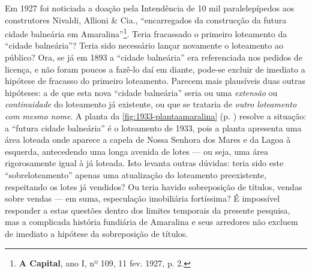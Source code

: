 Em 1927 foi noticiada a doação pela Intendência de 10 mil paralelepípedos aos construtores Nivaldi, Allioni \& Cia., ``encarregados da construcção da futura cidade balneária em Amaralina''\footnote{\textbf{A Capital}, ano I, nº 109, 11 fev. 1927, p. 2.}. Teria fracassado o primeiro loteamento da ``cidade balneária''? Teria sido necessário lançar novamente o loteamento ao público? Ora, se já em 1893 a ``cidade balneária'' era referenciada nos pedidos de licença, e não foram poucos a fazê-lo daí em diante, pode-se excluir de imediato a hipótese de fracasso do primeiro loteamento. Parecem mais plausíveis duas outras hipóteses: a de que esta nova ``cidade balneária'' seria ou uma \textit{extensão} ou \textit{continuidade} do loteamento já existente, ou que se trataria de \textit{outro loteamento com mesmo nome}. A planta da \autoref{fig:1933-plantaamaralina} (p. \pageref{fig:1933-plantaamaralina}) resolve a situação: a ``futura cidade balneária'' é o loteamento de 1933, pois a planta apresenta uma área loteada onde aparece a capela de Nossa Senhora dos Mares e da Lagoa à esquerda, antecedendo uma longa avenida de lotes --- ou seja, uma área rigorosamente igual à já loteada. Isto levanta outras dúvidas: teria sido este ``sobreloteamento'' apenas uma atualização do loteamento preexistente, respeitando os lotes já vendidos? Ou teria havido sobreposição de títulos, vendas sobre vendas --- em suma, especulação imobiliária fortíssima? É impossível responder a estas questões dentro dos limites temporais da presente pesquisa, mas a complicada história fundiária de Amaralina e seus arredores não excluem de imediato a hipótese da sobreposição de títulos.


